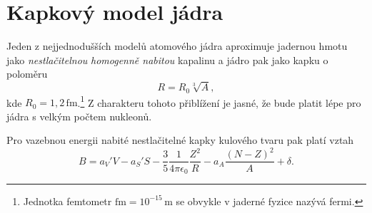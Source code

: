 \documentclass[a4paper,12pt,oneside]{article}
\def\unit#1{\,\mathrm{#1}}
\def\c{,\!}                             %
\theoremstyle{red}
\begin{document}
\section{Kapkový model jádra}
    Jeden z nejjednodušších modelů atomového jádra aproximuje jadernou hmotu jako \emph{nestlačitelnou} \emph{homogenně nabitou} kapalinu a jádro pak jako kapku o poloměru
    \begin{equation}
        R=R_{0}\sqrt[3]{A},
    \end{equation}
    kde $R_{0}=1\c2\unit{fm}$.\footnote{Jednotka femtometr $\mathrm{fm}=10^{-15}\unit{m}$ se obvykle v jaderné fyzice nazývá fermi.}
    Z charakteru tohoto přiblížení je jasné, že bude platit lépe pro jádra s velkým počtem nukleonů.

    Pro vazebnou energii nabité nestlačitelné kapky kulového tvaru pak platí vztah
    \begin{equation}
        \label{eq:BetheWeizsackerVS}
        B=a_{V}'V-a_{S}'S-\frac{3}{5}\frac{1}{4\pi\epsilon_{0}}\frac{Z^{2}}{R}-a_{A}\frac{\left(N-Z\right)^{2}}{A}+\delta.
    \end{equation}
\end{document}
